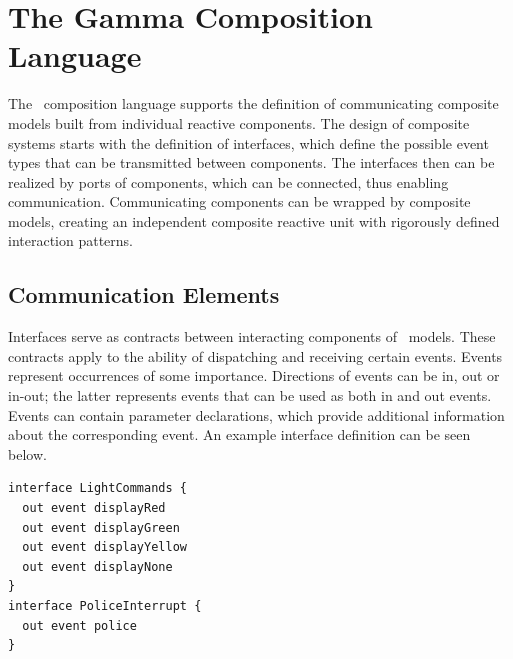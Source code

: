 %
%

\section{The Gamma Composition Language}
\label{sec:composition-language}
The \gamma\ composition language supports the definition of communicating composite models
built from individual reactive components. The design of composite systems starts with the definition of interfaces, which define the possible event types that can be transmitted between components. The interfaces then can be realized by ports of components, which can be connected, thus enabling communication. Communicating components can be wrapped by composite models, creating an independent composite reactive unit with rigorously defined interaction patterns.

\subsection{Communication Elements}
\label{sec:communication-elements}
Interfaces serve as contracts between
interacting components of \gamma\ models. These contracts apply to the ability of dispatching
and receiving certain events. Events represent occurrences of some importance. Directions of events can be in, out or in-out;
the latter represents events that can be used as both in and out events. Events can contain
parameter declarations, which provide additional information about the corresponding event. An example interface definition can be seen below.
\begin{lstlisting}
interface LightCommands {
  out event displayRed
  out event displayGreen
  out event displayYellow
  out event displayNone
}
interface PoliceInterrupt {
  out event police
}
\end{lstlisting}

